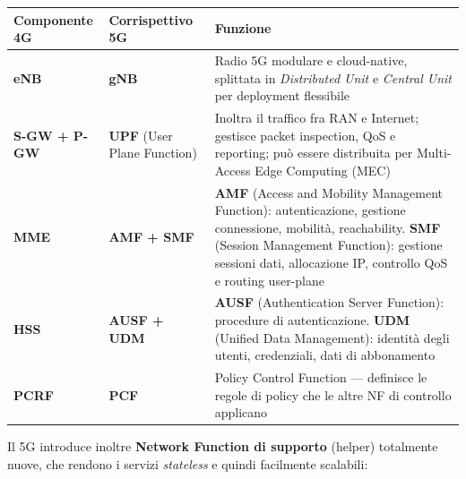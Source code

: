 \documentclass[
  italian,
  openany]{book}
\newcounter{none} %
\begin{document}
{\def\LTcaptype{none} %
\begin{longtable}[]{@{}
  >{\raggedright\arraybackslash}p{}
  >{\raggedright\arraybackslash}p{}
  >{\raggedright\arraybackslash}p{}@{}}
\toprule\noalign{}
\begin{minipage}[b]{\linewidth}\raggedright
\textbf{Componente 4G}
\end{minipage} & \begin{minipage}[b]{\linewidth}\raggedright
\textbf{Corrispettivo 5G}
\end{minipage} & \begin{minipage}[b]{\linewidth}\raggedright
\textbf{Funzione}
\end{minipage} \\
\midrule\noalign{}
\endhead
\bottomrule\noalign{}
\endlastfoot
\textbf{eNB} & \textbf{gNB} & Radio 5G modulare e cloud-native,
splittata in \emph{Distributed Unit} e \emph{Central Unit} per
deployment flessibile \\
\textbf{S-GW + P-GW} & \textbf{UPF} (User Plane Function) & Inoltra il
traffico fra RAN e Internet; gestisce packet inspection, QoS e
reporting; può essere distribuita per Multi-Access Edge Computing
(MEC) \\
\textbf{MME} & \textbf{AMF + SMF} & \textbf{AMF} (Access and Mobility
Management Function): autenticazione, gestione connessione, mobilità,
reachability. \textbf{SMF} (Session Management Function): gestione
sessioni dati, allocazione IP, controllo QoS e routing user-plane \\
\textbf{HSS} & \textbf{AUSF + UDM} & \textbf{AUSF} (Authentication
Server Function): procedure di autenticazione. \textbf{UDM} (Unified
Data Management): identità degli utenti, credenziali, dati di
abbonamento \\
\textbf{PCRF} & \textbf{PCF} & Policy Control Function --- definisce le
regole di policy che le altre NF di controllo applicano \\
\end{longtable}
}

Il 5G introduce inoltre \textbf{Network Function di supporto} (helper)
totalmente nuove, che rendono i servizi \emph{stateless} e quindi
facilmente scalabili:
\end{document}
